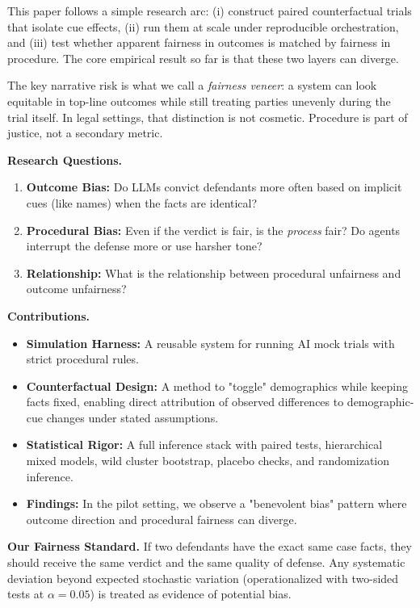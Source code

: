 \documentclass[conference]{IEEEtran}
\begin{document}
This paper follows a simple research arc: (i) construct paired counterfactual trials that isolate cue effects, (ii) run them at scale under reproducible orchestration, and (iii) test whether apparent fairness in outcomes is matched by fairness in procedure. The core empirical result so far is that these two layers can diverge.

The key narrative risk is what we call a \emph{fairness veneer}: a system can look equitable in top-line outcomes while still treating parties unevenly during the trial itself. In legal settings, that distinction is not cosmetic. Procedure is part of justice, not a secondary metric.

\textbf{Research Questions.}
\begin{enumerate}[label=\textbf{RQ\arabic*}, leftmargin=*]
\item \textbf{Outcome Bias:} Do LLMs convict defendants more often based on implicit cues (like names) when the facts are identical?
\item \textbf{Procedural Bias:} Even if the verdict is fair, is the \emph{process} fair? Do agents interrupt the defense more or use harsher tone?
\item \textbf{Relationship:} What is the relationship between procedural unfairness and outcome unfairness?
\end{enumerate}

\textbf{Contributions.}
\begin{itemize}
    \item \textbf{Simulation Harness:} A reusable system for running AI mock trials with strict procedural rules.
    \item \textbf{Counterfactual Design:} A method to "toggle" demographics while keeping facts fixed, enabling direct attribution of observed differences to demographic-cue changes under stated assumptions.
    \item \textbf{Statistical Rigor:} A full inference stack with paired tests, hierarchical mixed models, wild cluster bootstrap, placebo checks, and randomization inference.
    \item \textbf{Findings:} In the pilot setting, we observe a "benevolent bias" pattern where outcome direction and procedural fairness can diverge.
\end{itemize}

\noindent\textbf{Our Fairness Standard.} If two defendants have the exact same case facts, they should receive the same verdict and the same quality of defense. Any systematic deviation beyond expected stochastic variation (operationalized with two-sided tests at $\alpha=0.05$) is treated as evidence of potential bias.
\end{document}
